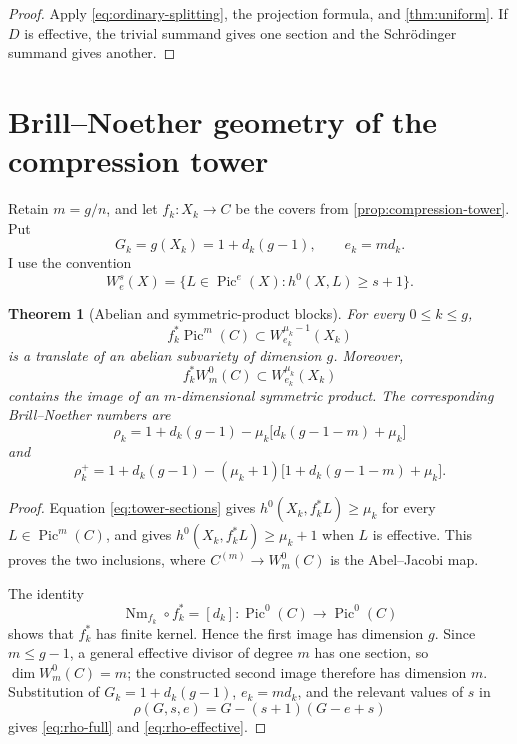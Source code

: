 \documentclass[11pt,reqno]{amsart}
\numberwithin{equation}{section}
\newtheorem{theorem}{Theorem}[section]
\theoremstyle{remark}
\DeclareMathOperator{\Pic}{Pic}
\DeclareMathOperator{\Nm}{Nm}
\begin{document}
\begin{proof}
Apply \eqref{eq:ordinary-splitting}, the projection formula, and
\cref{thm:uniform}.  If \(D\) is effective, the trivial summand gives one
section and the Schr\"odinger summand gives another.
\end{proof}

\section{Brill--Noether geometry of the compression tower}

Retain \(m=g/n\), and let \(f_k\colon X_k\to C\) be the covers from
\cref{prop:compression-tower}.  Put
\[
 G_k=g(X_k)=1+d_k(g-1),\qquad e_k=md_k.
\tag{5.1}\label{eq:BN-numbers}
\]
I use the convention
\[
 W_e^s(X)=
 \{L\in\Pic^e(X):h^0(X,L)\geq s+1\}.
\]

\begin{theorem}[Abelian and symmetric-product blocks]\label{thm:BN-blocks}
For every \(0\leq k\leq g\),
\[
 f_k^*\Pic^m(C)\subset W_{e_k}^{\mu_k-1}(X_k)
\tag{5.2}\label{eq:full-pic-BN}
\]
is a translate of an abelian subvariety of dimension \(g\).  Moreover,
\[
 f_k^*W_m^0(C)\subset W_{e_k}^{\mu_k}(X_k)
\tag{5.3}\label{eq:effective-BN}
\]
contains the image of an \(m\)-dimensional symmetric product.  The
corresponding Brill--Noether numbers are
\[
 \rho_k=
 1+d_k(g-1)
 -\mu_k\bigl[d_k(g-1-m)+\mu_k\bigr]
\tag{5.4}\label{eq:rho-full}
\]
and
\[
 \rho_k^+=
 1+d_k(g-1)
 -(\mu_k+1)
 \bigl[1+d_k(g-1-m)+\mu_k\bigr].
\tag{5.5}\label{eq:rho-effective}
\]
\end{theorem}

\begin{proof}
Equation \eqref{eq:tower-sections} gives
\(h^0(X_k,f_k^*L)\geq\mu_k\) for every \(L\in\Pic^m(C)\), and gives
\(h^0(X_k,f_k^*L)\geq\mu_k+1\) when \(L\) is effective.  This proves the
two inclusions, where \(C^{(m)}\to W_m^0(C)\) is the Abel--Jacobi map.

The identity
\[
 \Nm_{f_k}\circ f_k^*=[d_k]\colon\Pic^0(C)\longrightarrow\Pic^0(C)
\tag{5.6}\label{eq:norm-pull}
\]
shows that \(f_k^*\) has finite kernel.  Hence the first image has
dimension \(g\).  Since \(m\leq g-1\), a general effective divisor of
degree \(m\) has one section, so \(\dim W_m^0(C)=m\); the constructed
second image therefore has dimension \(m\).  Substitution of
\(G_k=1+d_k(g-1)\), \(e_k=md_k\), and the relevant values of \(s\) in
\[
 \rho(G,s,e)=G-(s+1)(G-e+s)
\]
gives \eqref{eq:rho-full} and \eqref{eq:rho-effective}.
\end{proof}
\end{document}

